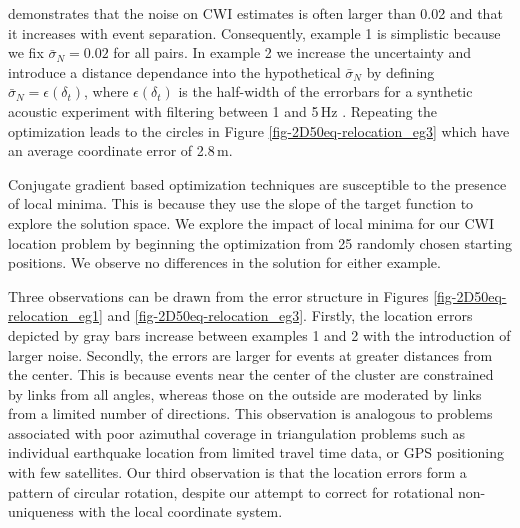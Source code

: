 \documentclass[12pt,double]{article}
\begin{document}
\citet{dr_Robinson11a} demonstrates that the noise on CWI estimates
is often larger than 0.02 and that it increases with event
separation. Consequently, example 1 is simplistic because we fix
$\bar{\sigma}_N=0.02$ for all pairs. In example 2 we increase the
uncertainty and introduce a distance dependance into the
hypothetical $\bar{\sigma}_N$ by defining
$\bar{\sigma}_N=\epsilon(\delta_t)$, where
$\epsilon(\delta_t)$ is the half-width of the errorbars for a
synthetic acoustic experiment with filtering between 1 and 5\,Hz
\citep[see Fig. 4(b) of ][]{dr_Robinson11a}. Repeating the
optimization leads to the circles in Figure
\ref{fig-2D50eq-relocation_eg3} which have an average coordinate
error of 2.8\,m.

Conjugate gradient based optimization techniques are susceptible to
the presence of local minima. This is because they use the slope of
the target function to explore the solution space. We explore the
impact of local minima for our CWI location problem by beginning the
optimization from 25 randomly chosen starting positions. We observe
no differences in the solution for either example.

Three observations can be drawn from the error structure in Figures
\ref{fig-2D50eq-relocation_eg1} and \ref{fig-2D50eq-relocation_eg3}.
Firstly, the location errors depicted by gray bars increase between
examples 1 and 2 with the introduction of larger noise. Secondly,
the errors are larger for events at greater distances from the
center. This is because events near the center of the cluster are
constrained by links from all angles, whereas those on the outside
are moderated by links from a limited number of directions. This
observation is analogous to problems associated with poor azimuthal
coverage in triangulation problems such as individual earthquake
location from limited travel time data, or GPS positioning with few
satellites. Our third observation is that the location errors form a
pattern of circular rotation, despite our attempt to correct for
rotational non-uniqueness with the local coordinate system.
\end{document}
